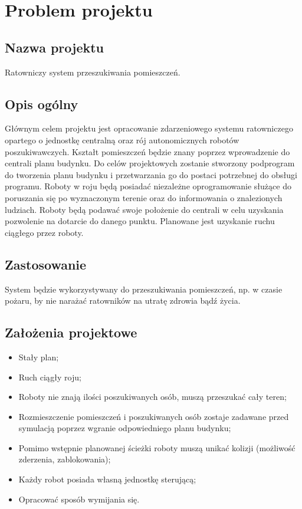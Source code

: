 \section{Problem projektu}
\label{sec:problem_projektu} %

\subsection{Nazwa projektu} %
\label{subsec:nazwa_projektu}         %
Ratowniczy system przeszukiwania pomieszczeń.
\subsection{Opis ogólny} 
\label{subsec:opis_ogolny} 
Głównym celem projektu jest opracowanie zdarzeniowego systemu ratowniczego opartego o jednostkę centralną oraz rój autonomicznych robotów poszukiwawczych. Kształt pomieszczeń będzie znany poprzez wprowadzenie do centrali planu budynku. Do celów projektowych zostanie stworzony podprogram do tworzenia planu budynku i przetwarzania go do postaci potrzebnej do obsługi programu. Roboty w roju będą posiadać niezależne oprogramowanie służące do poruszania się po wyznaczonym terenie oraz do informowania o znalezionych ludziach. Roboty będą podawać swoje położenie do centrali w celu uzyskania pozwolenie na dotarcie do danego punktu. Planowane jest uzyskanie ruchu ciągłego przez roboty.

\subsection{Zastosowanie} 
\label{subsec:zastosowanie}        
System będzie wykorzystywany do przeszukiwania pomieszczeń, np. w czasie pożaru, by nie narażać ratowników na utratę zdrowia bądź życia.

\subsection{Założenia projektowe} 
\label{subsec:zalozenia_projektowe}
\begin{itemize}
    \item Stały plan;
    \item Ruch ciągły roju;
    \item Roboty nie znają ilości poszukiwanych osób, muszą przeszukać cały teren;
    \item Rozmieszczenie pomieszczeń i poszukiwanych osób zostaje zadawane przed symulacją poprzez wgranie odpowiedniego planu budynku;
    \item Pomimo wstępnie planowanej ścieżki roboty muszą unikać kolizji (możliwość zderzenia, zablokowania);
    \item Każdy robot posiada własną jednostkę sterującą;
    \item Opracować sposób wymijania się.
\end{itemize}

